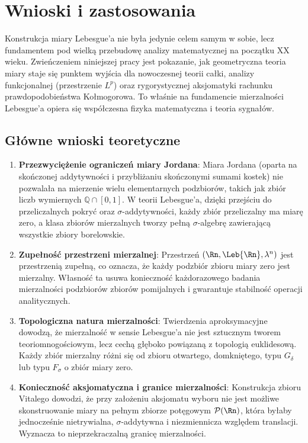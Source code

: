 \section{Wnioski i zastosowania}

Konstrukcja miary Lebesgue'a nie była jedynie celem samym w sobie, lecz fundamentem pod wielką przebudowę analizy matematycznej na początku XX wieku. Zwieńczeniem niniejszej pracy jest pokazanie, jak geometryczna teoria miary staje się punktem wyjścia dla nowoczesnej teorii całki, analizy funkcjonalnej (przestrzenie $L^p$) oraz rygorystycznej aksjomatyki rachunku prawdopodobieństwa Kołmogorowa. To właśnie na fundamencie mierzalności Lebesgue'a opiera się współczesna fizyka matematyczna i teoria sygnałów.

\subsection{Główne wnioski teoretyczne}

\begin{enumerate}
    \item \textbf{Przezwyciężenie ograniczeń miary Jordana}:
          Miara Jordana (oparta na skończonej addytywności i przybliżaniu skończonymi sumami kostek) nie pozwalała na mierzenie wielu elementarnych podzbiorów, takich jak zbiór liczb wymiernych $\mathbb{Q} \cap [0, 1]$. W teorii Lebesgue'a, dzięki przejściu do przeliczalnych pokryć oraz $\sigma$-addytywności, każdy zbiór przeliczalny ma miarę zero, a klasa zbiorów mierzalnych tworzy pełną $\sigma$-algebrę zawierającą wszystkie zbiory borelowskie.

    \item \textbf{Zupełność przestrzeni mierzalnej}:
          Przestrzeń $(\Rn, \Leb{\Rn}, \lambda^n)$ jest przestrzenią zupełną, co oznacza, że każdy podzbiór zbioru miary zero jest mierzalny. Własność ta usuwa konieczność każdorazowego badania mierzalności podzbiorów zbiorów pomijalnych i gwarantuje stabilność operacji analitycznych.

    \item \textbf{Topologiczna natura mierzalności}:
          Twierdzenia aproksymacyjne dowodzą, że mierzalność w sensie Lebesgue'a nie jest sztucznym tworem teoriomnogościowym, lecz cechą głęboko powiązaną z topologią euklidesową. Każdy zbiór mierzalny różni się od zbioru otwartego, domkniętego, typu $G_\delta$ lub typu $F_\sigma$ o zbiór miary zero.

    \item \textbf{Konieczność aksjomatyczna i granice mierzalności}:
          Konstrukcja zbioru Vitalego dowodzi, że przy założeniu aksjomatu wyboru nie jest możliwe skonstruowanie miary na pełnym zbiorze potęgowym $\mathcal{P}(\Rn)$, która byłaby jednocześnie nietrywialna, $\sigma$-addytywna i niezmiennicza względem translacji. Wyznacza to nieprzekraczalną granicę mierzalności.
\end{enumerate}

